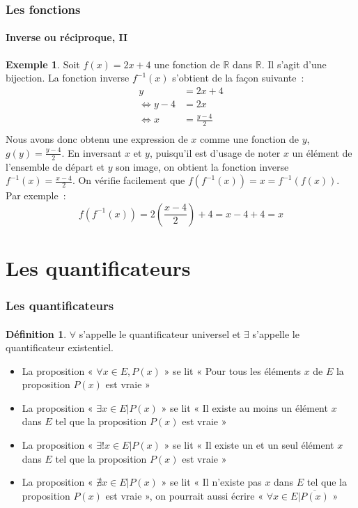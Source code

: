 \documentclass[10pt,notheorems]{beamer}
\theoremstyle{plain}
\theoremstyle{definition} %
\newtheorem{definition}{Définition}
\newtheorem{example}{Exemple}
\begin{document}
\begin{frame}
  \frametitle{Les fonctions}
  \framesubtitle{Inverse ou réciproque, II}
  \hypertarget{slide_fonctions_reciproque_2}{}

  \begin{example}\label{def:fonction_reciproque}
    Soit $f(x) = 2x+4$ une fonction de $\mathbb R$ dans $\mathbb R$. Il s'agit d'une bijection. La fonction inverse $f^{-1}(x)$ s'obtient de la façon suivante~:
    \[
      \begin{split}
        y &= 2x+4\\
        \Leftrightarrow y-4 &=2x\\
        \Leftrightarrow x &=\frac{y-4}{2}\\
      \end{split}
    \]
    Nous avons donc obtenu une expression de $x$ comme une fonction de $y$, $g(y)=\frac{y-4}{2}$. En inversant $x$ et $y$, puisqu'il est d'usage de noter $x$ un élément de l'ensemble de départ et $y$ son image, on obtient la fonction inverse $f^{-1}(x) = \frac{x-4}{2}$. On vérifie facilement que $f(f^{-1}(x)) = x = f^{-1}(f(x))$. Par exemple~:
    \[
      f(f^{-1}(x)) = 2 \left(\frac{x-4}{2}\right)+4 = x-4+4 = x
    \]
  \end{example}

\end{frame}

\section{Les quantificateurs}

\begin{frame}
  \frametitle{Les quantificateurs}
  \framesubtitle{}
  \hypertarget{slide_quantificateur_def}{}

  \begin{definition}\label{def:quantificateurs_universel_existentiel}
    $\forall$ s'appelle le quantificateur universel et $\exists$ s'appelle le quantificateur existentiel.
  \end{definition}

  \bigskip

  \begin{itemize}
  \item La proposition « $\forall x\in E, P(x)$ » se lit « Pour tous les éléments $x$ de $E$ la proposition $P(x)$ est vraie »\newline
  \item La proposition « $\exists x\in E | P(x) $ » se lit « Il existe au moins un élément $x$ dans $E$ tel que la proposition $P(x)$ est vraie »\newline
  \item La proposition « $\exists! x\in E | P(x) $ » se lit « Il existe un et un seul élément $x$ dans $E$ tel que la proposition $P(x)$ est vraie »\newline
  \item La proposition « $\nexists x\in E | P(x) $ » se lit « Il n'existe pas $x$ dans $E$ tel que la proposition $P(x)$ est vraie », on pourrait aussi écrire « $\forall x\in E | \overline{P(x)} $ »
  \end{itemize}

\end{frame}
\end{document}
